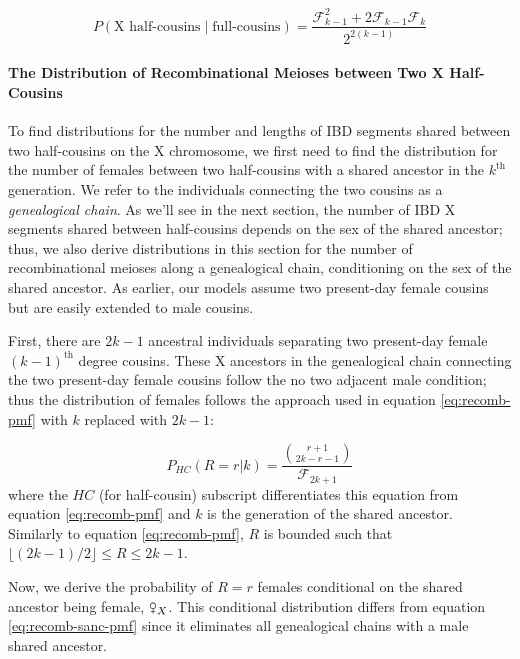 \documentclass[11pt]{article}
\newcommand{\fsxa}{\venus_X}
\begin{document}
\begin{equation}
  P(\text{X half-cousins} \;|\; \text{full-cousins}) = \frac{\mathcal{F}_{k-1}^2 + 2 \mathcal{F}_{k-1} \mathcal{F}_k}{2^{2(k-1)}}
\end{equation}

\paragraph{The Distribution of Recombinational Meioses between Two X Half-Cousins}
\label{p:two-cousins-rms}

To find distributions for the number and lengths of IBD segments shared between
two half-cousins on the X chromosome, we first need to find the distribution
for the number of females between two half-cousins with a shared ancestor in
the $k^\text{th}$ generation. We refer to the individuals connecting the two
cousins as a \emph{genealogical chain}. As we'll see in the next section, the
number of IBD X segments shared between half-cousins depends on the sex of the
shared ancestor; thus, we also derive distributions in this section for the
number of recombinational meioses along a genealogical chain, conditioning on
the sex of the shared ancestor. As earlier, our models assume two present-day
female cousins but are easily extended to male cousins.

First, there are $2k-1$ ancestral individuals separating two present-day female
$(k-1)^\text{th}$ degree cousins. These X ancestors in the genealogical chain
connecting the two present-day female cousins follow the no two adjacent male
condition; thus the distribution of females follows the approach used in
equation \eqref{eq:recomb-pmf} with $k$ replaced with $2k-1$:

\begin{equation}
  \label{eq:recomb-sanc-pmf}
  P_{HC}(R=r | k) = \frac{ {r+1 \choose 2k-r-1} }{\mathcal{F}_{2k+1}}
\end{equation}
%
where the $HC$ (for half-cousin) subscript differentiates this equation from
equation \eqref{eq:recomb-pmf} and $k$ is the generation of the shared
ancestor. Similarly to equation \eqref{eq:recomb-pmf}, $R$ is bounded such that
$\lfloor (2k - 1)/2 \rfloor \le R \le 2k - 1$.

Now, we derive the probability of $R=r$ females conditional on the shared
ancestor being female, $\fsxa$. This conditional distribution differs from
equation \eqref{eq:recomb-sanc-pmf} since it eliminates all genealogical chains
with a male shared ancestor. 
\end{document}
